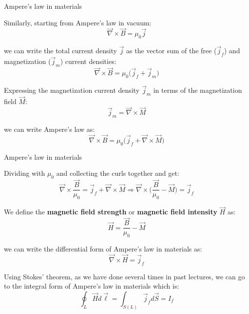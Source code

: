 %
%
%
%

\begin{frame}{Ampere's law in materials}

Similarly, starting from Ampere's law in vacuum:
\begin{equation*}
  \vec{\nabla} \times \vec{B} = \mu_0 \vec{j}
\end{equation*}

we can write the total current density $\vec{j}$ as the vector sum of the free ($\vec{j}_{f}$)
and magnetization ($\vec{j}_{m}$) current densities:
\begin{equation*}
  \vec{\nabla} \times \vec{B} = \mu_0 \Big( \vec{j}_{f} + \vec{j}_{m} \Big)
\end{equation*}

Expressing the magnetization current density $\vec{j}_{m}$ in terms of the
magnetization field $\vec{M}$:
\begin{equation*}
  \vec{j}_{m} = \vec{\nabla} \times \vec{M}
\end{equation*}

we can write Ampere's law as:
\begin{equation*}
  \vec{\nabla} \times \vec{B} = \mu_0 \Big( \vec{j}_{f} + \vec{\nabla} \times \vec{M} \Big)
\end{equation*}

\end{frame}


%
%
%

\begin{frame}{Ampere's law in materials}

Dividing with $\mu_0$ and collecting the curls together and get:
\begin{equation*}
  \vec{\nabla} \times \frac{\vec{B}}{\mu_0} = \vec{j}_{f} + \vec{\nabla} \times \vec{M} \Rightarrow
  \vec{\nabla} \times \Big( \frac{\vec{B}}{\mu_0} - \vec{M} \Big) = \vec{j}_{f}
\end{equation*}

We define the {\bf magnetic field strength} or {\bf magnetic field intensity} $\vec{H}$ as:
\begin{equation*}
  \vec{H} = \frac{\vec{B}}{\mu_0} - \vec{M}
\end{equation*}

we can write the differential form of Ampere's law in materials as:
\begin{equation*}
  \vec{\nabla} \times \vec{H} = \vec{j}_{f}
\end{equation*}

Using Stokes' theorem, as we have done several times in past lectures,
we can go to the integral form of Ampere's law in materials which is:
\begin{equation*}
  \oint_{L} \vec{H} d\vec{\ell} = \int_{S(L)} \vec{j}_{f} d\vec{S} = I_{f}
\end{equation*}

\end{frame}

